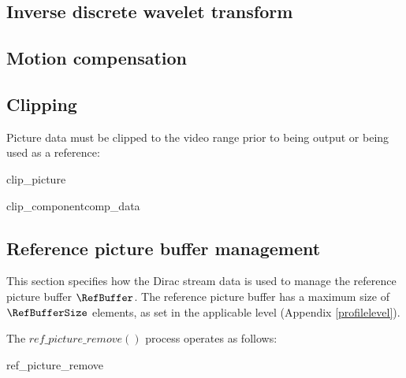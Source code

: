 \subsection{Inverse discrete wavelet transform}


\subsection{Motion compensation}


\subsection{Clipping}
\label{pictureclip}

Picture data must be clipped to the video range prior to being output or being
used as a reference:

\begin{pseudo}{clip\_picture}{}
\bsEND
\end{pseudo}

\begin{pseudo}{clip\_component}{comp\_data}
     \bsEND
\bsEND
\end{pseudo}

\subsection{Reference picture buffer management}
\label{refbuffer}

This section specifies how the Dirac stream data is used to manage the reference 
picture buffer $\RefBuffer$. The reference picture buffer has a maximum size of
$\RefBufferSize$ elements, as set in the applicable level (Appendix \ref{profilelevel}).

The $ref\_picture\_remove()$ process operates as
follows:

\begin{pseudo}{ref\_picture\_remove}{}
                \bsCODE{\RefBuffer[j]=\RefBuffer[j+1]}
            \bsEND
        \bsEND
    \bsEND
\bsEND
\bsCODE{\RetiredPictureList=\emptyset}
\end{pseudo}

